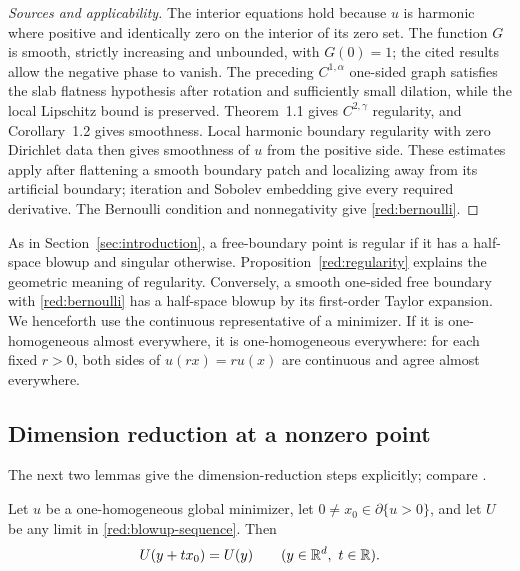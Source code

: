 \begin{proof}[Sources and applicability]
The interior equations hold because $u$ is harmonic where positive and
identically zero on the interior of its zero set.  The function $G$ is smooth,
strictly increasing and unbounded, with $G(0)=1$; the cited results allow
the negative phase to vanish.  The preceding $C^{1,\alpha}$ one-sided graph
satisfies the slab flatness hypothesis after rotation and sufficiently small
dilation, while the local Lipschitz bound is preserved.  Theorem~1.1 gives
$C^{2,\gamma}$ regularity, and Corollary~1.2 gives smoothness.  Local harmonic boundary regularity with zero Dirichlet data
\cite[Theorems~4.30--4.31 and Corollary~4.32]{Hunter2014} then gives
smoothness of $u$ from the positive side. These estimates apply after
flattening a smooth boundary patch and localizing away from its artificial
boundary; iteration and Sobolev embedding give every required derivative.  The Bernoulli condition and nonnegativity give
\eqref{red:bernoulli}.
\end{proof}

As in Section~\ref{sec:introduction}, a free-boundary point is regular
if it has a half-space blowup and singular otherwise.  Proposition~\ref{red:regularity} explains the
geometric meaning of regularity.  Conversely, a smooth one-sided free
boundary with \eqref{red:bernoulli} has a half-space blowup by its first-order
Taylor expansion.  We henceforth use the continuous representative of a
minimizer.  If it is one-homogeneous almost everywhere, it is one-homogeneous
everywhere: for each fixed $r>0$, both sides of $u(rx)=ru(x)$ are continuous
and agree almost everywhere.

\subsection{Dimension reduction at a nonzero point}\label{red:dimension-reduction}

The next two lemmas give the dimension-reduction steps explicitly;
compare \cite[Lemmas~10.9--10.10]{Velichkov2023}.

\begin{lemma}\label{red:translation}
Let $u$ be a one-homogeneous global minimizer, let
$0\ne x_0\in\partial\{u>0\}$, and let $U$ be any limit in
\eqref{red:blowup-sequence}.  Then
\[
 U(y+t x_0)=U(y)\qquad(y\in\R^d,\ t\in\R).
\]
\end{lemma}

